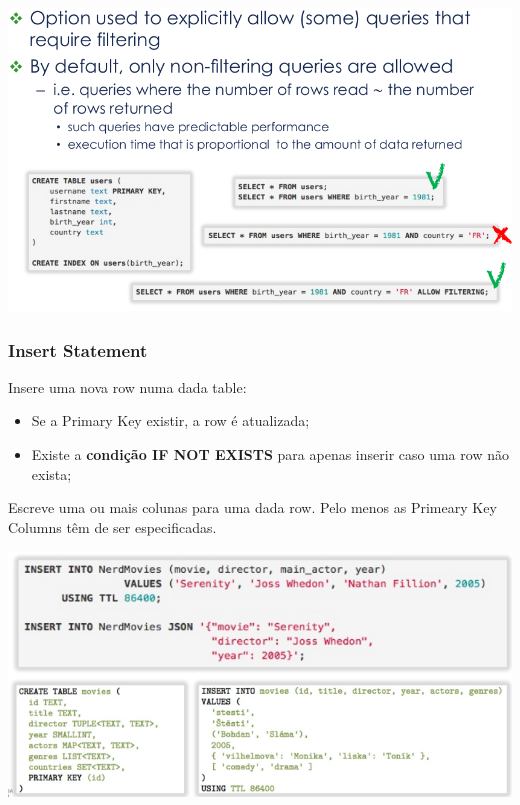 \documentclass{article}
\begin{document}
\begin{center}
  \includegraphics[scale=0.3]{35}
\end{center}

\pagebreak

\subsubsection{Insert Statement}

\begin{flushleft}
  Insere uma nova row numa dada table:
  \begin{itemize}
    \item Se a Primary Key existir, a row é atualizada;
    \item Existe a \textbf{condição IF NOT EXISTS} para apenas inserir caso uma row não exista;
  \end{itemize}

  Escreve uma ou mais colunas para uma dada row.
  Pelo menos as Primeary Key Columns têm de ser especificadas.

  \begin{center}
    \includegraphics[scale=0.3]{36}
  \end{center}
\end{flushleft}
\end{document}
